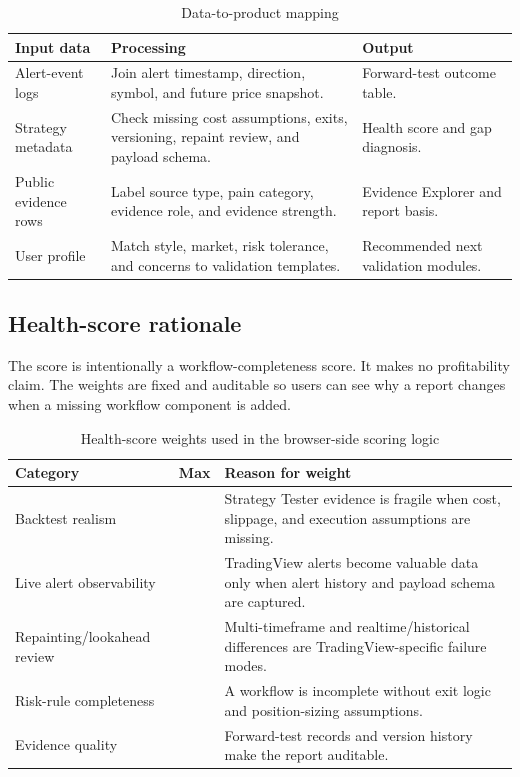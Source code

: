 \documentclass[11pt,a4paper]{article}
\begin{document}
\begin{table}[H]
\centering
\caption{Data-to-product mapping}
\begin{tabularx}{\textwidth}{>{\raggedright\arraybackslash}p{3.2cm}X>{\raggedright\arraybackslash}p{3.2cm}}
\toprule
\textbf{Input data} & \textbf{Processing} & \textbf{Output} \\
\midrule
Alert-event logs & Join alert timestamp, direction, symbol, and future price snapshot. & Forward-test outcome table. \\
Strategy metadata & Check missing cost assumptions, exits, versioning, repaint review, and payload schema. & Health score and gap diagnosis. \\
Public evidence rows & Label source type, pain category, evidence role, and evidence strength. & Evidence Explorer and report basis. \\
User profile & Match style, market, risk tolerance, and concerns to validation templates. & Recommended next validation modules. \\
\bottomrule
\end{tabularx}
\end{table}

\subsection{Health-score rationale}

The score is intentionally a workflow-completeness score. It makes no profitability claim. The weights are fixed and auditable so users can see why a report changes when a missing workflow component is added.

\begin{table}[H]
\centering
\caption{Health-score weights used in the browser-side scoring logic}
\small
\begin{tabularx}{\textwidth}{>{\raggedright\arraybackslash}p{3.4cm}>{\centering\arraybackslash}p{1.6cm}X}
\toprule
\textbf{Category} & \textbf{Max} & \textbf{Reason for weight} \\
\midrule
Backtest realism & 25 & Strategy Tester evidence is fragile when cost, slippage, and execution assumptions are missing. \\
Live alert observability & 20 & TradingView alerts become valuable data only when alert history and payload schema are captured. \\
Repainting/lookahead review & 20 & Multi-timeframe and realtime/historical differences are TradingView-specific failure modes. \\
Risk-rule completeness & 20 & A workflow is incomplete without exit logic and position-sizing assumptions. \\
Evidence quality & 15 & Forward-test records and version history make the report auditable. \\
\bottomrule
\end{tabularx}
\end{table}
\end{document}
